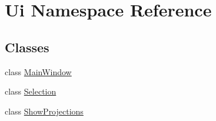 \hypertarget{namespace_ui}{}\section{Ui Namespace Reference}
\label{namespace_ui}
\subsection*{Classes}
\begin{DoxyCompactItemize}
\item 
class \mbox{\hyperlink{class_ui_1_1_main_window}{Main\+Window}}
\item 
class \mbox{\hyperlink{class_ui_1_1_selection}{Selection}}
\item 
class \mbox{\hyperlink{class_ui_1_1_show_projections}{Show\+Projections}}
\end{DoxyCompactItemize}
